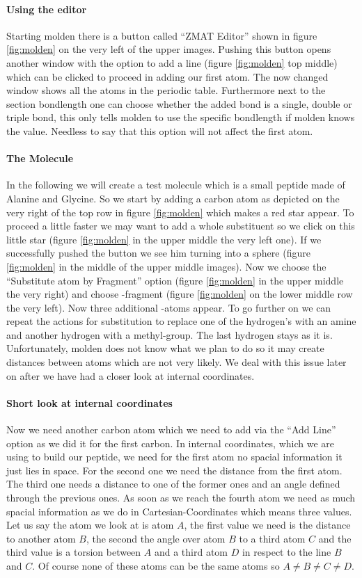 \documentclass[a4paper,11pt]{scrartcl}
\begin{document}
\paragraph{Using the editor}Starting molden there is a button called ``ZMAT Editor'' shown in figure \ref{fig:molden} on the very left of the upper images. Pushing this button opens another window with the option to add a line (figure \ref{fig:molden} top middle) which can be clicked to proceed in adding our first atom. The now changed window shows all the atoms in the periodic table. Furthermore next to the section bondlength one can choose whether the added bond is a single, double or triple bond, this only tells molden to use the specific bondlength if molden knows the value. Needless to say that this option will not affect the first atom.
\paragraph{The Molecule}In the following we will create a test molecule which is a small peptide made of Alanine and Glycine. So we start by adding a carbon atom as depicted on the very right of the top row in figure \ref{fig:molden} which makes a red star appear. To proceed a little faster we may want to add a whole substituent so we click on this little star (figure \ref{fig:molden} in the upper middle the very left one). If we successfully pushed the button we see him turning into a sphere (figure \ref{fig:molden} in the middle of the upper middle images). Now we choose the ``Substitute atom by Fragment'' option (figure \ref{fig:molden} in the upper middle the very right) and choose -fragment (figure \ref{fig:molden} on the lower middle row the very left). Now three additional -atoms appear. To go further on we can repeat the actions for substitution to replace one of the hydrogen's with an amine and another hydrogen with a methyl-group. The last hydrogen stays as it is. Unfortunately, molden does not know what we plan to do so it may create distances between atoms which are not very likely. We deal with this issue later on after we have had a closer look at internal coordinates.
\paragraph{Short look at internal coordinates}Now we need another carbon atom which we need to add via the ``Add Line''  option as we did it for the first carbon. In internal coordinates, which we are using to build our peptide, we need for the first atom no spacial information it just lies in space. For the second one we need the distance from the first atom. The third one needs a distance to one of the former ones and an angle defined through the previous ones. As soon as we reach the fourth atom we need as much spacial information as we do in Cartesian-Coordinates which means three values. Let us say the atom we look at is atom $A$, the first value we need is the distance to another atom $B$, the second the angle over atom $B$ to a third atom $C$ and the third value is a torsion between $A$ and a third atom $D$ in respect to the line $B$ and $C$. Of course none of these atoms can be the same atoms so $A\neq B \neq C \neq D$.
\end{document}
